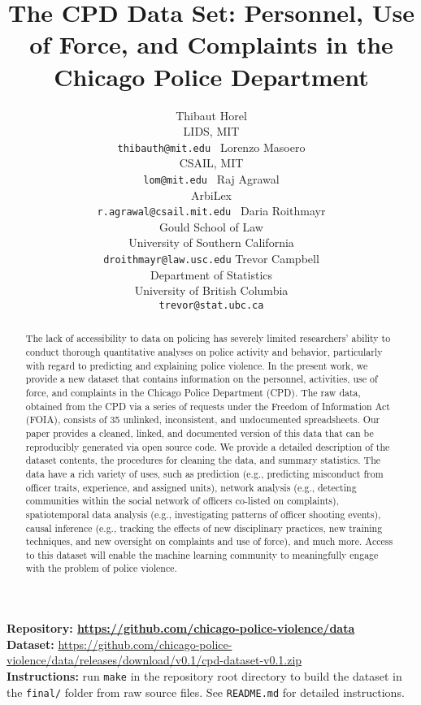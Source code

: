\documentclass{article}
\title{The CPD Data Set: Personnel, Use of Force, and Complaints in the Chicago Police Department}
\author{%
  Thibaut Horel\\
  LIDS, MIT \\
  \texttt{thibauth@mit.edu } 
  \And
  Lorenzo Masoero\\
  CSAIL, MIT \\
  \texttt{lom@mit.edu } 
   \And
 Raj Agrawal\\
  ArbiLex\\
  \texttt{r.agrawal@csail.mit.edu } 
   \And
  Daria Roithmayr\\
  Gould School of Law \\
  University of Southern California  \\
  \texttt{droithmayr@law.usc.edu}
 \And 
 Trevor Campbell \\
  Department of Statistics \\
   University of British Columbia\\
  \texttt{trevor@stat.ubc.ca}
}
\begin{document}
\maketitle

\begin{abstract}
\relax
The lack of accessibility to data on policing has severely limited researchers'
ability to conduct thorough quantitative analyses on police activity and
behavior, particularly with regard to predicting and explaining police
violence. In the present work, we provide a new dataset that contains
information on the personnel, activities, use of force, and complaints in the
Chicago Police Department (CPD). The raw data, obtained from the CPD via a
series of requests under the Freedom of Information Act (FOIA), consists of 35
unlinked, inconsistent, and undocumented spreadsheets. Our paper provides a
cleaned, linked, and documented version of this data that can be reproducibly
generated via open source code. We provide a detailed description of the
dataset contents, the procedures for cleaning the data, and summary statistics.
The data have a rich variety of uses, such as prediction (e.g., predicting
misconduct from officer traits, experience, and assigned units), network
analysis (e.g., detecting communities within the social network of officers
co-listed on complaints), spatiotemporal data analysis (e.g., investigating
patterns of officer shooting events), causal inference (e.g., tracking the
effects of new disciplinary practices, new training techniques, and new
oversight on complaints and use of force), and much more. Access to this
dataset will enable the machine learning community to meaningfully engage with
the problem of police violence.
\end{abstract}

\textbf{Repository: \url{https://github.com/chicago-police-violence/data}}\\
\textbf{Dataset:} \url{https://github.com/chicago-police-violence/data/releases/download/v0.1/cpd-dataset-v0.1.zip}\\
\textbf{Instructions:} run \texttt{make} in the repository root directory to build the dataset 
in the \texttt{final/} folder from raw source files. See \texttt{README.md} for detailed instructions.\\







\end{document}

